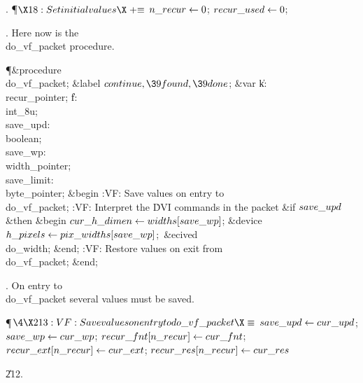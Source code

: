 . \P$\X18:Set initial values\X\mathrel{+}\S$\6
$\\{n\_recur}\gets0$;\5
$\\{recur\_used}\gets0$;\par
\fi

. Here now is the \\{do\_vf\_packet} procedure.

\Y\P\4\&{procedure}\1\  \\{do\_vf\_packet};\6
\4\&{label} $\\{continue},\39\\{found},\39\\{done}$;\6
\4\&{var} \|k: \\{recur\_pointer};\6
\|f: \\{int\_8u};\6
\\{save\_upd}: \\{boolean};\6
\\{save\_wp}: \\{width\_pointer};\6
\\{save\_limit}: \\{byte\_pointer};\2\6
\&{begin} :VF: Save values on entry to \\{do\_vf\_packet}\X;\6
:VF: Interpret the \.{DVI} commands in the packet\X\6
\&{if} $\\{save\_upd}$ \1\&{then}\6
\&{begin} $\\{cur\_h\_dimen}\gets\\{widths}[\\{save\_wp}]$;\6
\&{device} $\\{h\_pixels}\gets\\{pix\_widths}[\\{save\_wp}]$;\ \&{ecived}\6
\\{do\_width};\6
\&{end};\2\6
:VF: Restore values on exit from \\{do\_vf\_packet}\X;\6
\&{end};\par
\fi

. On entry to \\{do\_vf\_packet} several values must be saved.

\Y\P$\4\X213:VF: Save values on entry to \\{do\_vf\_packet}\X\S$\6
$\\{save\_upd}\gets\\{cur\_upd}$;\5
$\\{save\_wp}\gets\\{cur\_wp}$;\6
$\\{recur\_fnt}[\\{n\_recur}]\gets\\{cur\_fnt}$;\5
$\\{recur\_ext}[\\{n\_recur}]\gets\\{cur\_ext}$;\5
$\\{recur\_res}[\\{n\_recur}]\gets\\{cur\_res}$\par
\U212.\fi


